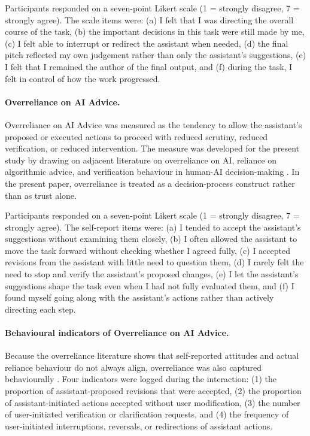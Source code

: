 \documentclass[sigconf,review,anonymous]{acmart}
\begin{document}
Participants responded on a seven-point Likert scale (1 = strongly disagree, 7 = strongly agree). The scale items were: (a) I felt that I was directing the overall course of the task, (b) the important decisions in this task were still made by me, (c) I felt able to interrupt or redirect the assistant when needed, (d) the final pitch reflected my own judgement rather than only the assistant's suggestions, (e) I felt that I remained the author of the final output, and (f) during the task, I felt in control of how the work progressed.

\paragraph{Overreliance on AI Advice.}
Overreliance on AI Advice was measured as the tendency to allow the assistant's proposed or executed actions to proceed with reduced scrutiny, reduced verification, or reduced intervention. The measure was developed for the present study by drawing on adjacent literature on overreliance on AI, reliance on algorithmic advice, and verification behaviour in human-AI decision-making \cite{bucinca2021trust,vasconcelos2023explanations,schemmer2022meta}. In the present paper, overreliance is treated as a decision-process construct rather than as trust alone.

Participants responded on a seven-point Likert scale (1 = strongly disagree, 7 = strongly agree). The self-report items were: (a) I tended to accept the assistant's suggestions without examining them closely, (b) I often allowed the assistant to move the task forward without checking whether I agreed fully, (c) I accepted revisions from the assistant with little need to question them, (d) I rarely felt the need to stop and verify the assistant's proposed changes, (e) I let the assistant's suggestions shape the task even when I had not fully evaluated them, and (f) I found myself going along with the assistant's actions rather than actively directing each step.

\paragraph{Behavioural indicators of Overreliance on AI Advice.}
Because the overreliance literature shows that self-reported attitudes and actual reliance behaviour do not always align, overreliance was also captured behaviourally \cite{bucinca2021trust,vasconcelos2023explanations}. Four indicators were logged during the interaction: (1) the proportion of assistant-proposed revisions that were accepted, (2) the proportion of assistant-initiated actions accepted without user modification, (3) the number of user-initiated verification or clarification requests, and (4) the frequency of user-initiated interruptions, reversals, or redirections of assistant actions.
\end{document}

